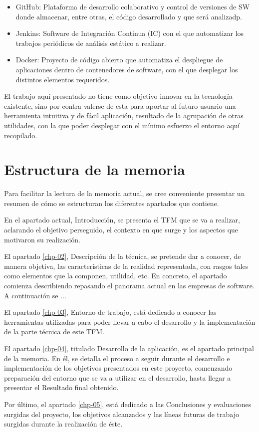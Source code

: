 \begin{itemize}
	\item GitHub\cite{github2017}: Plataforma de desarrollo colaborativo y control de versiones de \gls{SW} donde almacenar, entre otras, el código desarrollado y que será analizadp.
	\item Jenkins\cite{jenkins2017}: Software de Integración Continua (\gls{IC}) con el que automatizar los trabajos periódicos de análisis estático a realizar.
	\item Docker\cite{docker2017}: Proyecto de código abierto que automatiza el despliegue de aplicaciones dentro de contenedores de software, con el que desplegar los distintos elementos requeridos.
\end{itemize}

El trabajo aquí presentado no tiene como objetivo innovar en la tecnología existente, sino por contra valerse de esta para aportar al futuro usuario una herramienta intuitiva y de fácil aplicación, resultado de la agrupación de otras utilidades, con la que poder desplegar con el mínimo esfuerzo el entorno aquí recopilado. 

\section{Estructura de la memoria}


Para facilitar la lectura de la memoria actual, se cree conveniente presentar un resumen de cómo se estructuran los diferentes apartados que contiene.

En el apartado actual, Introducción, se presenta el \gls{TFM} que se va a realizar, aclarando el objetivo perseguido, el contexto en que surge y los aspectos que motivaron su realización.

El apartado \ref{chp-02}, Descripción de la técnica, se pretende dar a conocer, de manera objetiva, las características de la realidad representada, con rasgos tales como elementos que la componen, utilidad, etc. En concreto, el apartado comienza describiendo repasando el panorama actual en las empresas de software. A continuación se ...

El apartado \ref{chp-03}, Entorno de trabajo, está dedicado a conocer las herramientas utilizadas para poder llevar a cabo el desarrollo y la implementación de la parte técnica de este \gls{TFM}.

El apartado \ref{chp-04}, titulado Desarrollo de la aplicación, es el apartado principal de la memoria. En él, se detalla el proceso a seguir durante el desarrollo e implementación de los objetivos presentados en este proyecto, comenzando preparación del entorno que se va a utilizar en el desarrollo, hasta llegar a presentar el Resultado final obtenido.

Por último, el apartado \ref{chp-05}, está dedicado a las Conclusiones y evaluaciones surgidas del proyecto, los objetivos alcanzados y las líneas futuras de trabajo surgidas durante la realización de éste.

\endinput
